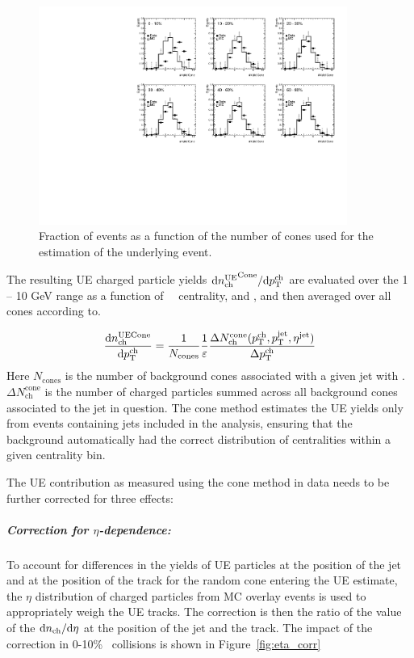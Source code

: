 \begin{figure}
\centering
\includegraphics[width=0.9\textwidth]{figures/main/UE/cone_stats}
\caption{Fraction of events as a function of the number of cones used for the estimation of the underlying event.}
\label{fig:cone_stats}
\end{figure}   

The resulting UE charged particle yields $\mathrm{d} \mbox{$n_{\mathrm{ch}}^{\mathrm{UE}}$}^{\mathrm{Cone}}/ \mathrm{d} \mbox{$p_{{\mathrm{T}}}^{\mathrm{ch}}$}$ are evaluated over the 1 -- 10 GeV range as a function of \pt\, \ptjet\, centrality, and \rvar, and then averaged over all cones according to.

\begin{eqnarray}
\frac{\mathrm{d} n_{\mathrm{ch}}^{\mathrm{UE Cone}}}{\mathrm{d} \mbox{$p_{{\mathrm{T}}}^{\mathrm{ch}}$}}  = \frac{1}{N_{\mathrm{cones}}} \frac{1}{\varepsilon} \frac{\Delta N^{\mathrm{cone}}_{\mathrm{ch}} (\mbox{$p_{{\mathrm{T}}}^{\mathrm{ch}}$}, \mbox{$p_{\mathrm{T}}^{\mathrm{jet}}$}, \mbox{$\eta^{\mathrm{jet}}$})}{\Delta \mbox{$p_{{\mathrm{T}}}^{\mathrm{ch}}$}}
\end{eqnarray}
Here $N_{\mathrm{cones}}$ is the number of background cones associated with a given jet with \ptjet.
$\Delta N^{\mathrm{cone}}_{\mathrm{ch}}$ is the number of charged particles summed across all background cones associated to the jet in question.
The cone method estimates the UE yields only from events containing jets included in the analysis, ensuring that the background automatically had the correct distribution of centralities within a given centrality bin.

The UE contribution as measured using the cone method in data needs to be further corrected for three effects:

\subparagraph{Correction for $\eta$-dependence: } To account for differences in the yields of UE particles at the position of the jet and at the position of the track for the random cone entering the UE estimate, the $\eta$ distribution of charged particles from MC overlay events is used to appropriately weigh the UE tracks.
The correction is then the ratio of the value of the $\mathrm{d} \mbox{$n_{\mathrm{ch}}$} / \mathrm{d}\eta$ at the position of the jet and the track.
The impact of the correction in 0-10\% \pbpb\ collisions is shown in Figure~\ref{fig:eta_corr}

